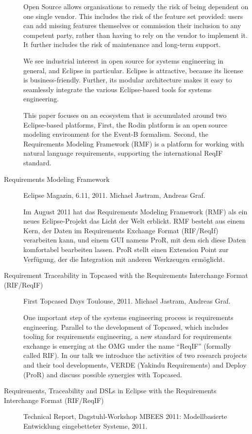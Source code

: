 \begin{description}
Open Source allows organisations to remedy the risk of being dependent on one single vendor. This includes the risk of the feature set provided: users can add missing features themselves or commission their inclusion to any competent party, rather than having to rely on the vendor to implement it. It further includes the risk of maintenance and long-term support.

We see industrial interest in open source for systems engineering in general, and Eclipse in particular. Eclipse is attractive, because its license is business-friendly. Further, its modular architecture makes it easy to seamlessly integrate the various Eclipse-based tools for systems engineering.

This paper focuses on an ecosystem that is accumulated around two Eclipse-based platforms, First, the Rodin platform is an open source modeling environment for the Event-B formalism. Second, the Requirements Modeling Framework (RMF) is a platform for working with natural language requirements, supporting the international ReqIF standard.

\item[Requirements Modeling Framework] Eclipse Magazin, 6.11, 2011. Michael Jastram, Andreas Graf.

Im August 2011 hat das Requirements Modeling Framework (RMF) als ein neues Eclipse-Projekt das Licht der Welt erblickt. RMF besteht aus einem Kern, der Daten im Requirements Exchange Format (RIF/ReqIf) verarbeiten kann, und einem GUI namens ProR, mit dem sich diese Daten komfortabel bearbeiten lassen. ProR stellt einen Extension Point zur Verfügung, der die Integration mit anderen Werkzeugen ermöglicht. 

\item[Requirement Traceability in Topcased with the Requirements Interchange Format (RIF/ReqIF)] First Topcased Days Toulouse, 2011. Michael Jastram, Andreas Graf.

One important step of the systems engineering process is requirements engineering. Parallel to the development of Topcased, which includes tooling for requirements engineering, a new standard for requirements exchange is emerging at the OMG under the name “ReqIF” (formally called RIF). In our talk we introduce the activities of two research projects and their tool developments, VERDE (Yakindu Requirements) and Deploy (ProR) and discuss possible synergies with Topcased.

\item[Requirements, Traceability and DSLs in Eclipse with the Requirements Interchange Format (RIF/ReqIF)] Technical Report, Dagstuhl-Workshop MBEES 2011: Modellbasierte Entwicklung eingebetteter Systeme, 2011.


\end{description}
